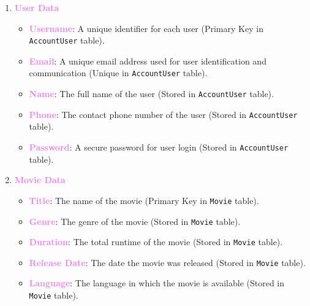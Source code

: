 \documentclass[a4paper,12pt]{article}  %
\renewcommand{\textbf}[1]{\textcolor{violet}{\bfseries #1}}
\begin{document}
\begin{enumerate}
    \item \textbf{User Data}
    \begin{itemize}
        \item \textbf{Username}: A unique identifier for each user (Primary Key in \texttt{AccountUser} table).
        \item \textbf{Email}: A unique email address used for user identification and communication (Unique in \texttt{AccountUser} table).
        \item \textbf{Name}: The full name of the user (Stored in \texttt{AccountUser} table).
        \item \textbf{Phone}: The contact phone number of the user (Stored in \texttt{AccountUser} table).
        \item \textbf{Password}: A secure password for user login (Stored in \texttt{AccountUser} table).
    \end{itemize}
    
    \item \textbf{Movie Data}
    \begin{itemize}
        \item \textbf{Title}: The name of the movie (Primary Key in \texttt{Movie} table).
        \item \textbf{Genre}: The genre of the movie (Stored in \texttt{Movie} table).
        \item \textbf{Duration}: The total runtime of the movie (Stored in \texttt{Movie} table).
        \item \textbf{Release Date}: The date the movie was released (Stored in \texttt{Movie} table).
        \item \textbf{Language}: The language in which the movie is available (Stored in \texttt{Movie} table).
    \end{itemize}
    

\end{enumerate}
\end{document}
